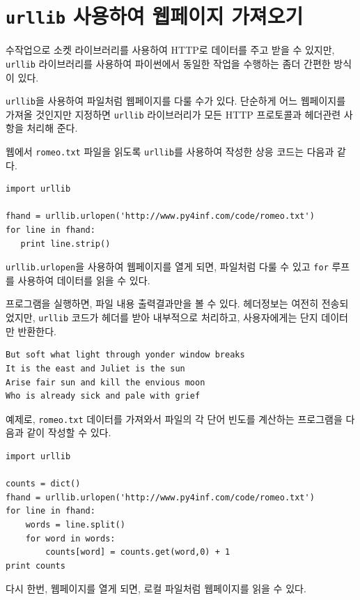 
\section{{\tt urllib} 사용하여 웹페이지 가져오기}

수작업으로 소켓 라이브러리를 사용하여 HTTP로 데이터를 주고 받을 수 있지만,
{\tt urllib} 라이브러리를 사용하여 파이썬에서 동일한 작업을 수행하는 좀더 간편한 방식이 있다.

{\tt urllib}을 사용하여 파일처럼 웹페이지를 다룰 수가 있다.
단순하게 어느 웹페이지를 가져올 것인지만 지정하면 {\tt urllib} 라이브러리가 모든 HTTP 프로토콜과 헤더관련 사항을 처리해 준다.

웹에서 {\tt romeo.txt} 파일을 읽도록 {\tt urllib}를 사용하여 작성한 상응 코드는 다음과 같다.

\beforeverb
\begin{verbatim}
import urllib

fhand = urllib.urlopen('http://www.py4inf.com/code/romeo.txt')
for line in fhand:
   print line.strip()
\end{verbatim}
\afterverb
%

{\tt urllib.urlopen}을 사용하여 웹페이지를 열게 되면, 파일처럼 다룰 수 있고 {\tt for} 루프를 사용하여 데이터를 읽을 수 있다.

프로그램을 실행하면, 파일 내용 출력결과만을 볼 수 있다. 
헤더정보는 여전히 전송되었지만, {\tt urllib} 코드가 헤더를 받아 내부적으로 처리하고, 사용자에게는 단지 데이터만 반환한다.

\beforeverb
\begin{verbatim}
But soft what light through yonder window breaks
It is the east and Juliet is the sun
Arise fair sun and kill the envious moon
Who is already sick and pale with grief
\end{verbatim}
\afterverb
%

예제로, {\tt romeo.txt} 데이터를 가져와서 파일의 각 단어 빈도를 계산하는 프로그램을 다음과 같이 작성할 수 있다.

\beforeverb
\begin{verbatim}
import urllib

counts = dict()
fhand = urllib.urlopen('http://www.py4inf.com/code/romeo.txt')
for line in fhand:
    words = line.split()
    for word in words:
        counts[word] = counts.get(word,0) + 1   
print counts
\end{verbatim}
\afterverb
%

다시 한번, 웹페이지를 열게 되면, 로컬 파일처럼 웹페이지를 읽을 수 있다.

